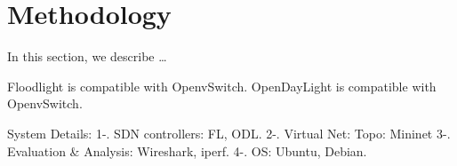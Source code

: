 \chapter{Methodology}\label{ch:methodology} %
In this section, we describe \dots




Floodlight is compatible with OpenvSwitch.
OpenDayLight is compatible with OpenvSwitch.

\cite{Mininet}


System Details:
1-. SDN controllers: FL, ODL.
2-. Virtual Net: Topo: Mininet
3-. Evaluation \& Analysis: Wireshark, iperf.
4-. OS: Ubuntu, Debian.
\bigskip
\bigskip
\bigskip




\bigskip
\bigskip
\bigskip




\bigskip
\bigskip
\bigskip







